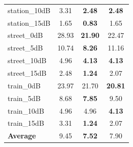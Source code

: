 \documentclass{article}
\begin{document}
\begin{table}[t]
{\begin{tabular}{lccc}
station\_10dB & 3.31 & \textbf{2.48} & \textbf{2.48} \\
station\_15dB & 1.65 & \textbf{0.83} & 1.65 \\
\midrule
street\_0dB & 28.93 & \textbf{21.90} & 22.47 \\
street\_5dB & 10.74 & \textbf{8.26} & 11.16 \\
street\_10dB & 4.96 & \textbf{4.13} & \textbf{4.13} \\
street\_15dB & 2.48 & \textbf{1.24} & 2.07 \\
\midrule
train\_0dB & 23.97 & 21.70 & \textbf{20.81} \\
train\_5dB & 8.68 & \textbf{7.85} & 9.50 \\
train\_10dB & 4.96 & 4.96 & \textbf{4.13} \\
train\_15dB & 3.31 & \textbf{1.24} & 2.07 \\
\midrule
\textbf{Average} & 9.45 & \textbf{7.52} & 7.90 \\
\bottomrule
\end{tabular}
}
\vspace{-2mm}
\end{table}
\end{document}

